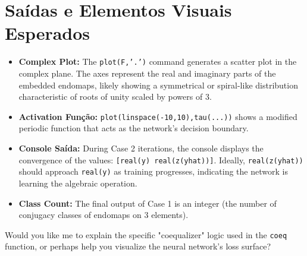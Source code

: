 \section{Saídas e Elementos Visuais Esperados}
\begin{itemize}
    \item \textbf{Complex Plot:} The \texttt{plot(F,'.')} command generates a scatter plot in the complex plane. The axes represent the real and imaginary parts of the embedded endomaps, likely showing a symmetrical or spiral-like distribution characteristic of roots of unity scaled by powers of 3.
    \item \textbf{Activation Função:} \texttt{plot(linspace(-10,10),tau(...))} shows a modified periodic function that acts as the network's decision boundary.
    \item \textbf{Console Saída:} During Case 2 iterations, the console displays the convergence of the values: \texttt{[real(y) real(z(yhat))]}. Ideally, \texttt{real(z(yhat))} should approach \texttt{real(y)} as training progresses, indicating the network is learning the algebraic operation.
    \item \textbf{Class Count:} The final output of Case 1 is an integer (the number of conjugacy classes of endomaps on 3 elements).
\end{itemize}

\vspace{2em}
Would you like me to explain the specific "coequalizer" logic used in the \texttt{coeq} function, or perhaps help you visualize the neural network's loss surface?
